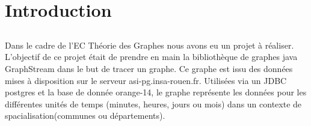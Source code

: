 \chapter{Introduction}

\section*{}
Dans le cadre de l'EC Théorie des Graphes nous avons eu un projet à réaliser.
L'objectif de ce projet était de prendre en main la bibliothèque de graphes java GraphStream dans le but de tracer un graphe. Ce graphe est issu des données mises à disposition sur le serveur asi-pg.insa-rouen.fr. Utilisées via un JDBC postgres et la base de donnée orange-14, le graphe représente les données pour les différentes unités de temps (minutes, heures, jours ou mois) dans un contexte de spacialisation(communes ou départements).
\section*{}
